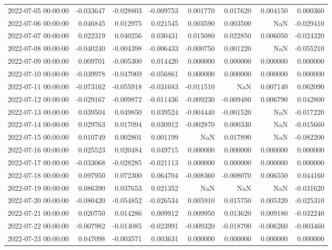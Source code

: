 \begin{tabular}{lrrrrrrr}
2022-07-05 00:00:00 & -0.033647 & -0.028803 & -0.009753 & 0.001770 & 0.017620 & 0.004150 & 0.000360 \\
2022-07-06 00:00:00 & 0.046845 & 0.012975 & 0.021545 & 0.003590 & 0.003500 & NaN & -0.029410 \\
2022-07-07 00:00:00 & 0.022319 & 0.040256 & 0.030431 & 0.015080 & 0.022850 & 0.006050 & -0.024320 \\
2022-07-08 00:00:00 & -0.040240 & -0.004398 & -0.006433 & -0.000750 & 0.001220 & NaN & -0.055210 \\
2022-07-09 00:00:00 & 0.009701 & -0.005300 & 0.014420 & 0.000000 & 0.000000 & 0.000000 & 0.000000 \\
2022-07-10 00:00:00 & -0.039978 & -0.047069 & -0.056861 & 0.000000 & 0.000000 & 0.000000 & 0.000000 \\
2022-07-11 00:00:00 & -0.073162 & -0.055918 & -0.031683 & -0.011510 & NaN & 0.007140 & 0.062090 \\
2022-07-12 00:00:00 & -0.029167 & -0.009872 & -0.011436 & -0.009230 & -0.009480 & 0.006790 & 0.042800 \\
2022-07-13 00:00:00 & 0.039504 & 0.049850 & 0.039524 & -0.004440 & -0.001520 & NaN & -0.017220 \\
2022-07-14 00:00:00 & 0.029763 & 0.017094 & 0.030912 & -0.002870 & 0.000330 & NaN & -0.015660 \\
2022-07-15 00:00:00 & 0.010749 & 0.002801 & 0.001199 & NaN & 0.017890 & NaN & -0.082200 \\
2022-07-16 00:00:00 & 0.025523 & 0.020484 & 0.049715 & 0.000000 & 0.000000 & 0.000000 & 0.000000 \\
2022-07-17 00:00:00 & -0.033068 & -0.028285 & -0.021113 & 0.000000 & 0.000000 & 0.000000 & 0.000000 \\
2022-07-18 00:00:00 & 0.097950 & 0.072300 & 0.064704 & -0.008360 & -0.008070 & 0.006550 & 0.044160 \\
2022-07-19 00:00:00 & 0.086390 & 0.037653 & 0.021352 & NaN & NaN & NaN & -0.031620 \\
2022-07-20 00:00:00 & -0.080420 & -0.054852 & -0.026534 & 0.005910 & 0.015750 & 0.005320 & -0.025310 \\
2022-07-21 00:00:00 & 0.020750 & 0.014286 & 0.009912 & 0.009950 & 0.013620 & 0.009180 & -0.032240 \\
2022-07-22 00:00:00 & -0.007982 & -0.014085 & -0.023991 & -0.009320 & -0.018700 & -0.006260 & -0.003460 \\
2022-07-23 00:00:00 & 0.047098 & -0.003571 & 0.003631 & 0.000000 & 0.000000 & 0.000000 & 0.000000 \\

\end{tabular}
